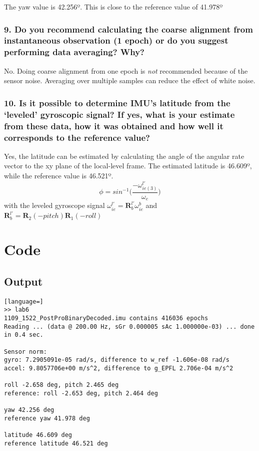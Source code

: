 \documentclass{article}
\begin{document}
The yaw value is 42.256º. This is close to the reference value of 41.978º

\subsubsection*{9. Do you recommend calculating the coarse alignment from instantaneous
observation (1 epoch) or do you suggest performing data averaging? Why?}

No. Doing coarse alignment from one epoch is \textit{not} recommended because of the sensor noise.
Averaging over multiple samples can reduce the effect of white noise.

\subsubsection*{10. Is it possible to determine IMU’s latitude from the ‘leveled’ gyroscopic signal?
If yes, what is your estimate from these data, how it was obtained and how well
it corresponds to the reference value?}

Yes, the latitude can be estimated by calculating the angle of the angular rate 
vector to the xy plane of the local-level frame.
The estimated latitude is 46.609º, while the reference value is 46.521º.
\begin{equation*}
\phi = sin^{-1}\Big(\frac{-\omega^{l'}_{ie(3)}}{\omega_e}\Big)
\end{equation*}
with the leveled gyroscope signal $\omega^{l'}_{ie} = \mathbf{R}^{l'}_b \omega^b_{ie}$ and $\mathbf{R}^{l'}_b = \mathbf{R}_2(-pitch)\mathbf{R}_1(-roll)$

\newpage
\section*{Code}


\subsection*{Output}
\begin{lstlisting}[language=]
>> lab6
1109_1522_PostProBinaryDecoded.imu contains 416036 epochs
Reading ... (data @ 200.00 Hz, sGr 0.000005 sAc 1.000000e-03) ... done in 0.4 sec.

Sensor norm:
gyro: 7.2905091e-05 rad/s, difference to w_ref -1.606e-08 rad/s
accel: 9.8057706e+00 m/s^2, difference to g_EPFL 2.706e-04 m/s^2

roll -2.658 deg, pitch 2.465 deg
reference: roll -2.653 deg, pitch 2.464 deg

yaw 42.256 deg
reference yaw 41.978 deg

latitude 46.609 deg
reference latitude 46.521 deg
\end{lstlisting}
\end{document}
